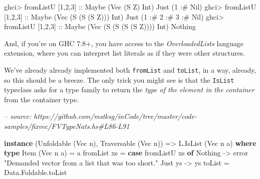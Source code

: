 \documentclass[]{article}
\newenvironment{Shaded}{}{}
\newcommand{\CommentTok}[1]{\textcolor[rgb]{0.38,0.63,0.69}{\textit{#1}}}
\newcommand{\DataTypeTok}[1]{\textcolor[rgb]{0.56,0.13,0.00}{#1}}
\newcommand{\DecValTok}[1]{\textcolor[rgb]{0.25,0.63,0.44}{#1}}
\newcommand{\FunctionTok}[1]{\textcolor[rgb]{0.02,0.16,0.49}{#1}}
\newcommand{\KeywordTok}[1]{\textcolor[rgb]{0.00,0.44,0.13}{\textbf{#1}}}
\newcommand{\NormalTok}[1]{#1}
\newcommand{\OtherTok}[1]{\textcolor[rgb]{0.00,0.44,0.13}{#1}}
\newcommand{\StringTok}[1]{\textcolor[rgb]{0.25,0.44,0.63}{#1}}
\begin{document}
\begin{Shaded}
\begin{Highlighting}[]
\NormalTok{ghci}\FunctionTok{>}\NormalTok{ fromListU [}\DecValTok{1}\NormalTok{,}\DecValTok{2}\NormalTok{,}\DecValTok{3}\NormalTok{]}\OtherTok{ ::} \DataTypeTok{Maybe}\NormalTok{ (}\DataTypeTok{Vec}\NormalTok{ (}\DataTypeTok{S} \DataTypeTok{Z}\NormalTok{) }\DataTypeTok{Int}\NormalTok{)}
\DataTypeTok{Just}\NormalTok{ (}\DecValTok{1} \FunctionTok{:#} \DataTypeTok{Nil}\NormalTok{)}
\NormalTok{ghci}\FunctionTok{>}\NormalTok{ fromListU [}\DecValTok{1}\NormalTok{,}\DecValTok{2}\NormalTok{,}\DecValTok{3}\NormalTok{]}\OtherTok{ ::} \DataTypeTok{Maybe}\NormalTok{ (}\DataTypeTok{Vec}\NormalTok{ (}\DataTypeTok{S}\NormalTok{ (}\DataTypeTok{S}\NormalTok{ (}\DataTypeTok{S} \DataTypeTok{Z}\NormalTok{))) }\DataTypeTok{Int}\NormalTok{)}
\DataTypeTok{Just}\NormalTok{ (}\DecValTok{1} \FunctionTok{:#} \DecValTok{2} \FunctionTok{:#} \DecValTok{3} \FunctionTok{:#} \DataTypeTok{Nil}\NormalTok{)}
\NormalTok{ghci}\FunctionTok{>}\NormalTok{ fromListU [}\DecValTok{1}\NormalTok{,}\DecValTok{2}\NormalTok{,}\DecValTok{3}\NormalTok{]}\OtherTok{ ::} \DataTypeTok{Maybe}\NormalTok{ (}\DataTypeTok{Vec}\NormalTok{ (}\DataTypeTok{S}\NormalTok{ (}\DataTypeTok{S}\NormalTok{ (}\DataTypeTok{S}\NormalTok{ (}\DataTypeTok{S} \DataTypeTok{Z}\NormalTok{)))) }\DataTypeTok{Int}\NormalTok{)}
\DataTypeTok{Nothing}
\end{Highlighting}
\end{Shaded}

And, if you're on GHC 7.8+, you have access to the \emph{OverloadedLists}
language extension, where you can interpret list literals as if they were other
structures.

We've already already implemented both \texttt{fromList} and \texttt{toList}, in
a way, already, so this should be a breeze. The only trick you might see is that
the \texttt{IsList} typeclass asks for a type family to return the \emph{type of
the element in the container} from the container type.

\begin{Shaded}
\begin{Highlighting}[]
\CommentTok{-- source: https://github.com/mstksg/inCode/tree/master/code-samples/fixvec/FVTypeNats.hs#L86-L91}

\KeywordTok{instance}\NormalTok{ (}\DataTypeTok{Unfoldable}\NormalTok{ (}\DataTypeTok{Vec}\NormalTok{ n), }\DataTypeTok{Traversable}\NormalTok{ (}\DataTypeTok{Vec}\NormalTok{ n)) }\OtherTok{=>} \DataTypeTok{L.IsList}\NormalTok{ (}\DataTypeTok{Vec}\NormalTok{ n a) }\KeywordTok{where}
    \KeywordTok{type} \DataTypeTok{Item}\NormalTok{ (}\DataTypeTok{Vec}\NormalTok{ n a) }\FunctionTok{=}\NormalTok{ a}
\NormalTok{    fromList xs }\FunctionTok{=} \KeywordTok{case}\NormalTok{ fromListU xs }\KeywordTok{of}
                    \DataTypeTok{Nothing} \OtherTok{->}\NormalTok{ error }\StringTok{"Demanded vector from a list that was too short."}
                    \DataTypeTok{Just}\NormalTok{ ys }\OtherTok{->}\NormalTok{ ys}
\NormalTok{    toList      }\FunctionTok{=}\NormalTok{ Data.Foldable.toList}
\end{Highlighting}
\end{Shaded}
\end{document}
